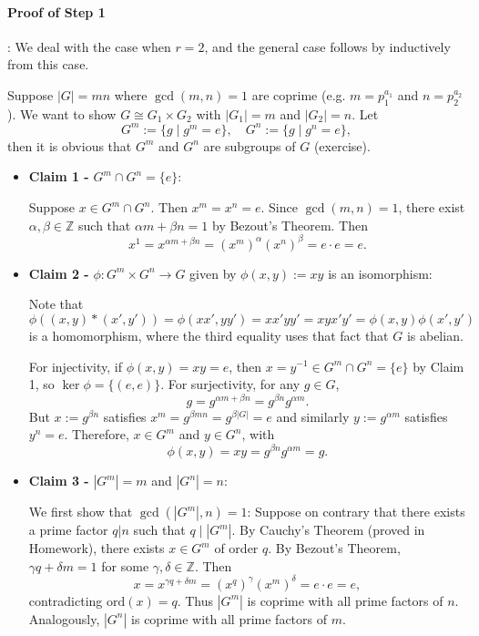 \paragraph{Proof of Step 1}:
We deal with the case when $r = 2$, and the general case follows by inductively from this case. 

Suppose $|G| = m n$
where $\gcd(m,n) = 1$ are coprime (e.g. $m = p_1^{a_1}$ and $n = p_2^{a_2}$). We want to show $G \cong G_1 \times G_2$ with $|G_1| = m$ and $|G_2| = n$. Let 
$$G^m := \{ g \mid g^m = e\}, \quad G^n := \{ g \mid g^n =e \},$$
then it is obvious that $G^m$ and $G^n$ are subgroups of $G$ (exercise).
\begin{itemize}
    \item \textbf{Claim 1 -} $G^m \cap G^n = \{e\}$: 
    
    Suppose $x \in G^m \cap G^n$. Then $x^m = x^n = e$. Since $\gcd(m, n) = 1$, there exist $\alpha, \beta \in \mathbb{Z}$ such that $\alpha m + \beta n = 1$ by Bezout's Theorem. Then 
    $$x^1 = x^{\alpha m + \beta n} = (x^m)^\alpha (x^n)^\beta = e \cdot e = e.$$
    
    \item \textbf{Claim 2 -} $\phi: G^m \times G^n \to G$ given by $\phi(x, y) := xy$ is an isomorphism:
    
    Note that 
    $$\phi((x,y)*(x',y')) = \phi(xx',yy')=xx'yy'=xyx'y' = \phi(x,y)\phi(x',y')$$ 
    is a homomorphism, where the third equality uses that fact that $G$ is abelian. 
    
    For injectivity, if $\phi(x,y) =xy = e$, then $x = y^{-1} \in G^m \cap G^n = \{e\}$ by Claim 1, so $\ker \phi = \{(e, e)\}$. For surjectivity, for any $g \in G$, 
    $$g = g^{\alpha m + \beta n} =  g^{\beta n} g^{\alpha m}.$$
    But $x := g^{\beta n}$ satisfies $x^m = g^{
    \beta mn} = g^{\beta|G|} = e$ and similarly $y := g^{\alpha m}$ satisfies $y^n = e$. Therefore, $x \in G^m$ and $y \in G^n$, with
    $$\phi(x,y)=xy = g^{\beta n}g^{\alpha m} = g.$$
    
    \item \textbf{Claim 3 -} $|G^m| = m$ and $|G^n| = n$:

    We first show that $\gcd(|G^m|, n) = 1$: 
    Suppose on contrary that there exists a prime factor $q | n$ such that $q \mid |G^m|$. By Cauchy's Theorem (proved in Homework), there exists $x \in G^m$ of order $q$. By Bezout's Theorem, $\gamma q + \delta m = 1$ for some $\gamma, \delta \in \mathbb{Z}$. Then 
    $$x = x^{\gamma q + \delta m} = (x^q)^\gamma (x^m)^\delta = e \cdot e = e,$$ 
    contradicting $\text{ord}(x)=q$. Thus 
    $|G^m|$ is coprime with all prime factors of $n$.
    Analogously, $|G^n|$ is coprime with all prime factors of $m$. 
    

\end{itemize}
